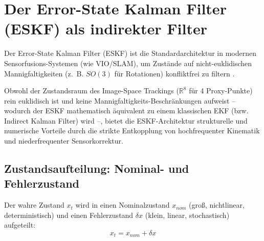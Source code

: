 \documentclass{article}
\begin{document}
\section{Der Error-State Kalman Filter (ESKF) als indirekter Filter}
\label{sec:eskf}

Der Error-State Kalman Filter (ESKF) ist die Standardarchitektur in modernen Sensorfusions-Systemen (wie VIO/SLAM), um Zustände auf nicht-euklidischen Mannigfaltigkeiten (z.~B. $SO(3)$ für Rotationen) konfliktfrei zu filtern \cite{sola2017quaternion}. 

Obwohl der Zustandsraum des Image-Space Trackings ($\mathbb{R}^8$ für 4 Proxy-Punkte) rein euklidisch ist und keine Mannigfaltigkeits-Beschränkungen aufweist – wodurch der ESKF mathematisch äquivalent zu einem klassischen EKF (bzw. Indirect Kalman Filter) wird –, bietet die ESKF-Architektur strukturelle und numerische Vorteile durch die strikte Entkopplung von hochfrequenter Kinematik und niederfrequenter Sensorkorrektur.




\subsection{Zustandsaufteilung: Nominal- und Fehlerzustand}
Der wahre Zustand $x_t$ wird in einen Nominalzustand $x_{nom}$ (groß, nichtlinear, deterministisch) und einen Fehlerzustand $\delta x$ (klein, linear, stochastisch) aufgeteilt:
\begin{equation}
    x_t = x_{nom} + \delta x
\end{equation}
\end{document}
